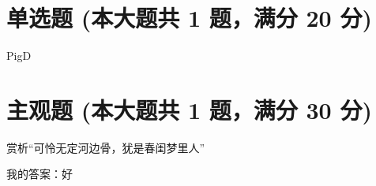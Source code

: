 \documentclass[12pt, a4paper, addpoints, answers]{exam}
\begin{document}
\hspace{5cm}

\section{\normalsize{单选题 (本大题共 1 题，满分 20 分)}}
\hspace{1.5cm}

\begin{questions}
\question[20] PigD

\begin{oneparchoices}
\end{oneparchoices}

\end{questions}

\hspace{5cm}

\section{\normalsize{主观题 (本大题共 1 题，满分 30 分)}}
\hspace{1.5cm}

\begin{questions}
\question[30] 赏析“可怜无定河边骨，犹是春闺梦里人”

我的答案：好

\end{questions}
\end{document}
